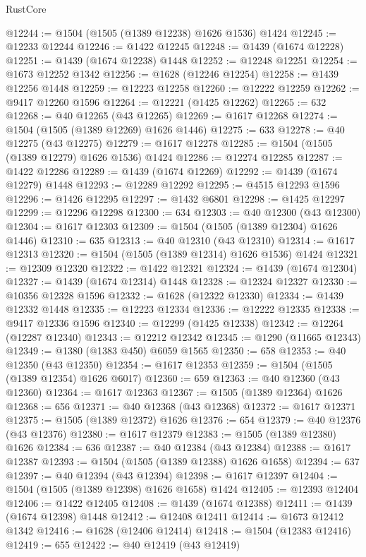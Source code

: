 \begin{lexlean}{RustCore}
\begin{coremodule}
@12244 := @1504 (@1505 (@1389 @12238) @1626 @1536) @1424
@12245 := @12233 @12244
@12246 := @1422 @12245
@12248 := @1439 (@1674 @12228)
@12251 := @1439 (@1674 @12238) @1448
@12252 := @12248 @12251
@12254 := @1673 @12252 @1342
@12256 := @1628 (@12246 @12254)
@12258 := @1439 @12256 @1448
@12259 := @12223 @12258
@12260 := @12222 @12259
@12262 := @9417 @12260 @1596
@12264 := @12221 (@1425 @12262)
@12265 := 632
@12268 := @40 @12265 (@43 @12265)
@12269 := @1617 @12268
@12274 := @1504 (@1505 (@1389 @12269) @1626 @1446)
@12275 := 633
@12278 := @40 @12275 (@43 @12275)
@12279 := @1617 @12278
@12285 := @1504 (@1505 (@1389 @12279) @1626 @1536) @1424
@12286 := @12274 @12285
@12287 := @1422 @12286
@12289 := @1439 (@1674 @12269)
@12292 := @1439 (@1674 @12279) @1448
@12293 := @12289 @12292
@12295 := @4515 @12293 @1596
@12296 := @1426 @12295
@12297 := @1432 @6801
@12298 := @1425 @12297
@12299 := @12296 @12298
@12300 := 634
@12303 := @40 @12300 (@43 @12300)
@12304 := @1617 @12303
@12309 := @1504 (@1505 (@1389 @12304) @1626 @1446)
@12310 := 635
@12313 := @40 @12310 (@43 @12310)
@12314 := @1617 @12313
@12320 := @1504 (@1505 (@1389 @12314) @1626 @1536) @1424
@12321 := @12309 @12320
@12322 := @1422 @12321
@12324 := @1439 (@1674 @12304)
@12327 := @1439 (@1674 @12314) @1448
@12328 := @12324 @12327
@12330 := @10356 @12328 @1596
@12332 := @1628 (@12322 @12330)
@12334 := @1439 @12332 @1448
@12335 := @12223 @12334
@12336 := @12222 @12335
@12338 := @9417 @12336 @1596
@12340 := @12299 (@1425 @12338)
@12342 := @12264 (@12287 @12340)
@12343 := @12212 @12342
@12345 := @1290 (@11665 @12343)
@12349 := @1380 (@1383 @450) @6059 @1565
@12350 := 658
@12353 := @40 @12350 (@43 @12350)
@12354 := @1617 @12353
@12359 := @1504 (@1505 (@1389 @12354) @1626 @6017)
@12360 := 659
@12363 := @40 @12360 (@43 @12360)
@12364 := @1617 @12363
@12367 := @1505 (@1389 @12364) @1626
@12368 := 656
@12371 := @40 @12368 (@43 @12368)
@12372 := @1617 @12371
@12375 := @1505 (@1389 @12372) @1626
@12376 := 654
@12379 := @40 @12376 (@43 @12376)
@12380 := @1617 @12379
@12383 := @1505 (@1389 @12380) @1626
@12384 := 636
@12387 := @40 @12384 (@43 @12384)
@12388 := @1617 @12387
@12393 := @1504 (@1505 (@1389 @12388) @1626 @1658)
@12394 := 637
@12397 := @40 @12394 (@43 @12394)
@12398 := @1617 @12397
@12404 := @1504 (@1505 (@1389 @12398) @1626 @1658) @1424
@12405 := @12393 @12404
@12406 := @1422 @12405
@12408 := @1439 (@1674 @12388)
@12411 := @1439 (@1674 @12398) @1448
@12412 := @12408 @12411
@12414 := @1673 @12412 @1342
@12416 := @1628 (@12406 @12414)
@12418 := @1504 (@12383 @12416)
@12419 := 655
@12422 := @40 @12419 (@43 @12419)

\end{coremodule}
\end{lexlean}
